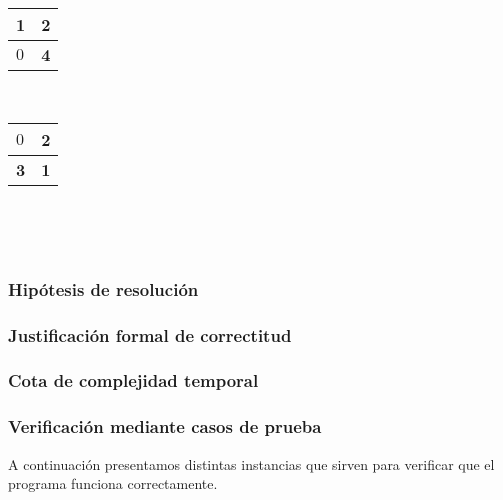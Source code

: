 \documentclass[11pt, a4paper, twoside]{article}
\begin{document}
\begin{minipage}{0.5\textwidth}
	\centering
	\begin{tabular}{ | l | l |}
		\hline 
		\textbf{1}  & \textbf{2} \\ 
		\hline 
		$0$  & \textbf{4} \\ 
		\hline
	\end{tabular}  \\
\end{minipage}
\begin{minipage}{0.5\textwidth}
	\begin{tabular}{ | l | l |}
		\hline 
		$0$     & \textbf{2} \\ 
		\hline 
		\textbf{3}  & \textbf{1} \\ 
		\hline
	\end{tabular} \\
\end{minipage}  \\

\subsubsection{Hipótesis de resolución}

\subsubsection{Justificación formal de correctitud}

\subsubsection{Cota de complejidad temporal}

\subsubsection{Verificación mediante casos de prueba}

A continuación presentamos distintas instancias que sirven para verificar que el programa funciona correctamente.\\ 
\end{document}
